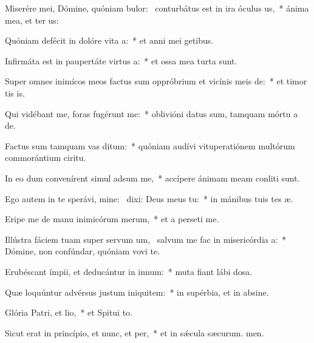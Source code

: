 \item Miserére mei, Dómine, quóniam bulor:~\pscross{} conturbátus est in ira óculus us,~* ánima mea, et ter us:
\item Quóniam defécit in dolóre vita a:~* et anni mei  getibus.
\item Infirmáta est in paupertáte virtus a:~* et ossa mea turta sunt.
\item Super omnes inimícos meos factus sum oppróbrium et vicínis meis de:~* et timor tis is.
\item Qui vidébant me, foras fugérunt  me:~* oblivióni datus sum, tamquam mórtu a de.
\item Factus sum tamquam vas ditum:~* quóniam audívi vituperatiónem multórum commorántium  ciritu.
\item In eo dum convenírent simul adsum me,~* accípere ánimam meam conliti sunt.
\item Ego autem in te sperávi, mine:~\pscross{} dixi: Deus meus  tu:~* in mánibus tuis tes æ.
\item Eripe me de manu inimicórum merum,~* et a perseti me.
\item Illústra fáciem tuam super servum um,~\pscross{} salvum me fac in misericórdia a:~* Dómine, non confúndar, quóniam vovi te.
\item Erubéscant ímpii, et deducántur in innum:~* muta fiant lábi dosa.
\item Quæ loquúntur advérsus justum iniquitem:~* in supérbia, et in absine.
\item Glória Patri, et lio,~* et Spitui to.
\item Sicut erat in princípio, et nunc, et per,~* et in sǽcula sæcurum. men.

